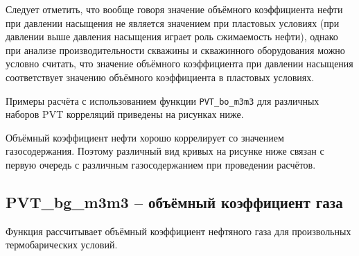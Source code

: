 Следует отметить, что вообще говоря значение объёмного коэффициента нефти при давлении насыщения не является значением при пластовых условиях (при давлении выше давления насыщения играет роль сжимаемость нефти), однако при анализе производительности скважины и скважинного оборудования можно условно считать, что значение объёмного коэффициента при давлении насыщения соответствует значению  объёмного коэффициента в пластовых условиях.  


Примеры расчёта с использованием функции \texttt{PVT_bo_m3m3} для различных наборов PVT корреляций приведены на рисунках ниже.

Объёмный коэффициент нефти хорошо коррелирует со значением газосодержания. Поэтому различный вид кривых на рисунке ниже связан с первую очередь с различным газосодержанием при проведении расчётов.

\newcommand{\BoDataFile}{data/Bo_P_data.txt}

\subsection{PVT\_bg\_m3m3 – объёмный коэффициент газа}
Функция рассчитывает объёмный коэффициент нефтяного газа для произвольных термобарических условий. 

